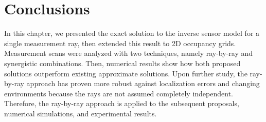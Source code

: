



\section{Conclusions}

In this chapter, we presented the exact solution to the inverse sensor model for a single measurement ray, then extended this result to 2D occupancy grids. Measurement scans were analyzed with two techniques, namely ray-by-ray and synergistic combinations. Then, numerical results show how both proposed solutions outperform existing approximate solutions. Upon further study, the ray-by-ray approach has proven more robust against localization errors and changing environments because the rays are not assumed completely independent. Therefore, the ray-by-ray approach is applied to the subsequent proposals, numerical simulations, and experimental results.





